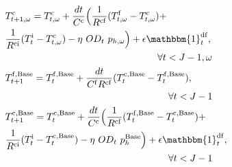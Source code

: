\documentclass[11pt,a4paper]{article}
\begin{document}
\begin{subequations}
\begin{align}
           & T^{\rm{c}}_{t+1,\omega} = T^{\rm{c}}_{t,\omega} +    \frac{dt}{C^{\rm{c}}}\Bigl(\frac{1}{R^{\rm{cf}}} (T^{\rm{f}}_{t,\omega} - T^{\rm{c}}_{t,\omega}) +  \notag                                                                                                                                                                                                                                                                                                                                                                                      \\ & \frac{1}{R^{\rm{ci}}} (T^{\rm{i}}_t - T^{\rm{c}}_{t,\omega}) - \eta  \  OD_t \ p_{h,\omega} \Bigr) + \epsilon \mathbbm{1}^{\rm{df}}_{t}, \notag \\ & \hspace{5.6cm} \forall{t<J-1,\omega} \label{P2:state-space-2} \\
           & T^{\rm{f},\text{Base}}_{t+1} = T^{\rm{f},\text{Base}}_{t} +   \frac{dt}{C^{\rm{f}}R^{\rm{cf}}} (T^{\rm{c},\text{Base}}_{t} - T^{\rm{f},\text{Base}}_{t}), \notag                                                                                                                                                                                                                                                                                                                                                                                     \\ & \hspace{6cm}\forall{t<J-1} \label{P2:state-space-3}                                                                                         \\
           & T^{\rm{c},\text{Base}}_{t+1} = T^{\rm{c},\text{Base}}_t +   \frac{dt}{C^{\rm{c}}}\Bigl(\frac{1}{R^{\rm{cf}}} (T^{\rm{f},\text{Base}}_t - T^{\rm{c},\text{Base}}_t) + \notag                                                                                                                                                                                                                                                                                                                                                                          \\ & \frac{1}{R^{\rm{ci}}} (T^{\rm{i}}_t - T^{\rm{c},\text{Base}}_t) - \eta  \  OD_t \ p_{h}^{\text{Base}} \Bigr) + \epsilon \mathbbm{1}^{\rm{df}}_{t}, \notag \\ & \hspace{6cm} \forall{t<J-1} \label{P2:state-space-4} \\

\end{align}
\end{subequations}
\end{document}
